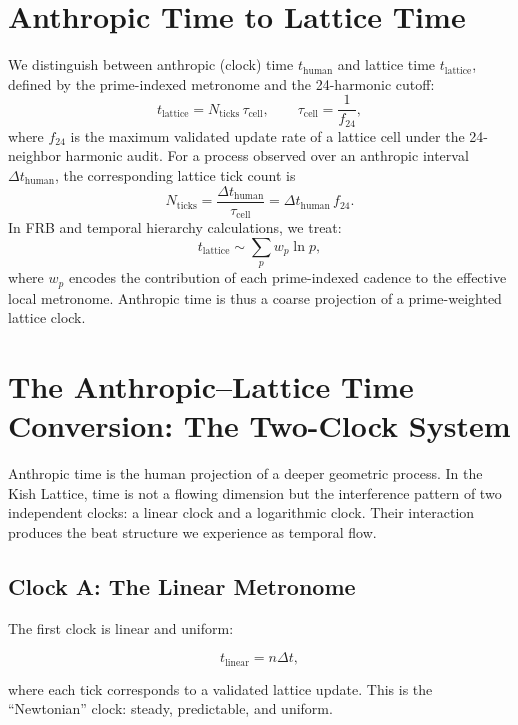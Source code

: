 \documentclass[12pt,oneside]{book}
\begin{document}
\section{Anthropic Time to Lattice Time}

We distinguish between anthropic (clock) time \(t_{\text{human}}\) and lattice time
\(t_{\text{lattice}}\), defined by the prime-indexed metronome and the 24-harmonic cutoff:
\begin{equation}
t_{\text{lattice}}
=
N_{\text{ticks}}\,\tau_{\text{cell}},
\qquad
\tau_{\text{cell}}
=
\frac{1}{f_{24}},
\end{equation}
where \(f_{24}\) is the maximum validated update rate of a lattice cell under the
24-neighbor harmonic audit. For a process observed over an anthropic interval
\(\Delta t_{\text{human}}\), the corresponding lattice tick count is
\begin{equation}
N_{\text{ticks}}
=
\frac{\Delta t_{\text{human}}}{\tau_{\text{cell}}}
=
\Delta t_{\text{human}}\,f_{24}.
\end{equation}
In FRB and temporal hierarchy calculations, we treat:
\begin{equation}
t_{\text{lattice}}
\sim
\sum_{p} w_p \ln p,
\end{equation}
where \(w_p\) encodes the contribution of each prime-indexed cadence to the
effective local metronome. Anthropic time is thus a coarse projection of a
prime-weighted lattice clock.

\section{The Anthropic--Lattice Time Conversion: The Two-Clock System}

Anthropic time is the human projection of a deeper geometric process. In the Kish Lattice,
time is not a flowing dimension but the interference pattern of two independent clocks:
a linear clock and a logarithmic clock. Their interaction produces the beat structure we
experience as temporal flow.

\subsection{Clock A: The Linear Metronome}

The first clock is linear and uniform:


\[
t_{\text{linear}} = n \Delta t,
\]


where each tick corresponds to a validated lattice update. This is the ``Newtonian'' clock:
steady, predictable, and uniform.
\end{document}
